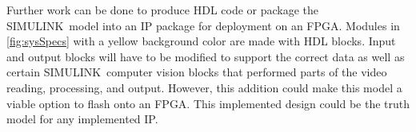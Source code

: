 \par Further work can be done to produce HDL code or package the SIMULINK\textregisteredmark\ model into an IP package for deployment on an FPGA. Modules in \autoref{fig:sysSpecs} with a yellow background color are made with HDL blocks. Input and output blocks will have to be modified to support the correct data as well as certain SIMULINK\textregisteredmark\ computer vision blocks that performed parts of the video reading, processing, and output. However, this addition could make this model a viable option to flash onto an FPGA. This implemented design could be the truth model for any implemented IP.
